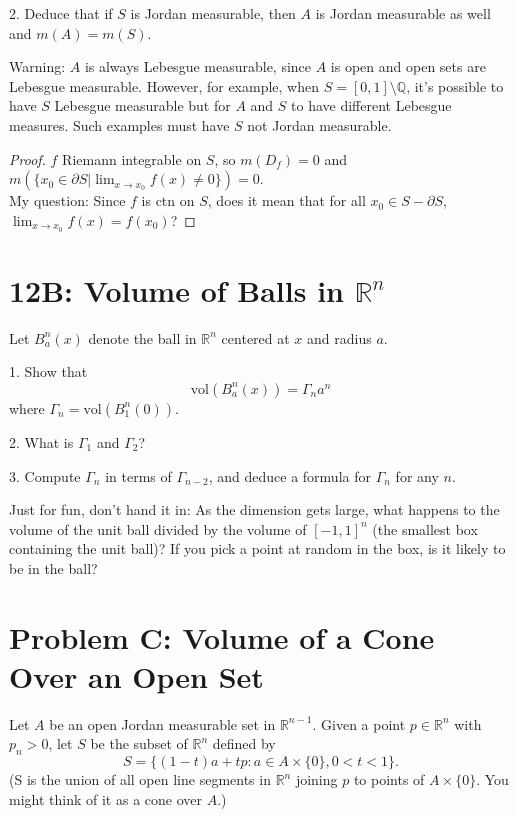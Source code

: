 \documentclass[lang=cn,11pt]{template}
\begin{document}
2. Deduce that if \( S \) is Jordan measurable, then \( A \) is Jordan measurable as well and \( m(A) = m(S) \).

Warning: \( A \) is always Lebesgue measurable, since \( A \) is open and open sets are Lebesgue measurable. However, for example, when \( S = [0, 1] \setminus \mathbb{Q} \), it’s possible to have \( S \) Lebesgue measurable but for \( A \) and \( S \) to have different Lebesgue measures. Such examples must have \( S \) not Jordan measurable.

\begin{proof}
    $f$ Riemann integrable on $S$, so $m(D_f) = 0$ and $m(\{x_0 \in \partial S | \lim_{x \rightarrow x_0} f(x)  \not = 0  \}) = 0$.\\
    My question: Since $f$ is ctn on $S$, does it mean that for all $x_0 \in S - \partial S $, $\lim_{x \rightarrow x_0} f(x) = f(x_0)$? 
\end{proof}




\section*{12B: Volume of Balls in \( \mathbb{R}^n \)}
Let \( B^n_a(x) \) denote the ball in \( \mathbb{R}^n \) centered at \( x \) and radius \( a \).

1. Show that
   \[
   \text{vol}(B^n_a(x)) = \Gamma_n a^n
   \]
   where \( \Gamma_n = \text{vol}(B^n_1(0)) \).

2. What is \( \Gamma_1 \) and \( \Gamma_2 \)?

3. Compute \( \Gamma_n \) in terms of \( \Gamma_{n-2} \), and deduce a formula for \( \Gamma_n \) for any \( n \).

Just for fun, don’t hand it in: As the dimension gets large, what happens to the volume of the unit ball divided by the volume of \( [-1, 1]^n \) (the smallest box containing the unit ball)? If you pick a point at random in the box, is it likely to be in the ball?

\section*{Problem C: Volume of a Cone Over an Open Set}
Let \( A \) be an open Jordan measurable set in \( \mathbb{R}^{n-1} \). Given a point \( p \in \mathbb{R}^n \) with \( p_n > 0 \), let \( S \) be the subset of \( \mathbb{R}^n \) defined by
\[
S = \{ (1 - t)a + tp : a \in A \times \{0\}, 0 < t < 1 \}.
\]
(S is the union of all open line segments in \( \mathbb{R}^n \) joining \( p \) to points of \( A \times \{0\} \). You might think of it as a cone over \( A \).)
\end{document}
